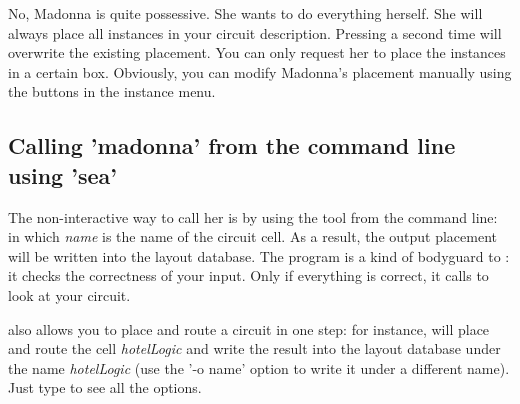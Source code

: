 {No, Madonna is quite possessive. She wants to do everything herself.
She will always place all instances in your circuit description.
Pressing  a second time will overwrite the
existing placement.
You can only request her to place the instances in a certain box.
Obviously, you can modify Madonna's placement manually using the
buttons in the instance menu.}

\subsection{Calling 'madonna' from the command line using 'sea'}
\label{m-sea}
The non-interactive way to call her is by using the tool  from the
command line:  in which {\sl name} is the name of the
circuit cell. As a result, the output placement will be written into the layout
database.  The program  is a kind of bodyguard to : it
checks the correctness of your input. Only if everything is correct, it calls
 to look at your circuit. 

 also allows you to place and route a circuit in one step:
for instance, will place and route the cell {\sl hotelLogic} and write the
result into the layout database under the name {\sl hotelLogic} (use the '-o
name' option to write it under a different name). Just type  to
see all the options.  

